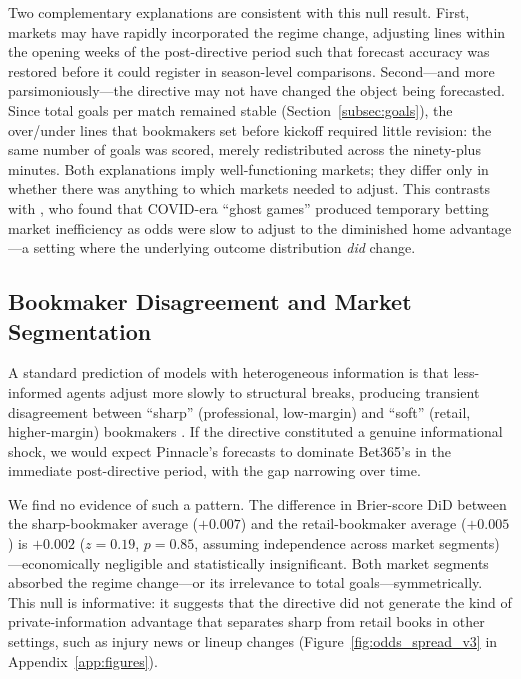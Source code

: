 \documentclass[12pt]{article}
\begin{document}
Two complementary explanations are consistent with this null result.
First, markets may have rapidly incorporated the regime change, adjusting
lines within the opening weeks of the post-directive period such that
forecast accuracy was restored before it could register in
season-level comparisons. Second---and more parsimoniously---the directive
may not have changed the object being forecasted. Since total goals per
match remained stable (Section~\ref{subsec:goals}), the over/under lines that
bookmakers set before kickoff required little revision: the same number of
goals was scored, merely redistributed across the ninety-plus minutes.
Both explanations imply well-functioning markets; they differ only in
whether there was anything to which markets needed to adjust. This contrasts with
\citet{fischer2022home}, who found that COVID-era ``ghost games'' produced
temporary betting market inefficiency as odds were slow to adjust to the
diminished home advantage---a setting where the underlying outcome distribution
\emph{did} change.

\subsection{Bookmaker Disagreement and Market Segmentation}
\label{subsec:disagreement}

A standard prediction of models with heterogeneous information is that
less-informed agents adjust more slowly to structural breaks, producing
transient disagreement between ``sharp'' (professional, low-margin) and
``soft'' (retail, higher-margin) bookmakers \citep{levitt2004gambling}. If the
directive constituted a genuine informational shock, we would expect
Pinnacle's forecasts to dominate Bet365's in the immediate
post-directive period, with the gap narrowing over time.

We find no evidence of such a pattern. The difference in Brier-score DiD
between the sharp-bookmaker average ($+0.007$) and the retail-bookmaker average ($+0.005$) is
$+0.002$ ($z = 0.19$, $p = 0.85$, assuming independence across market segments)---economically negligible and statistically insignificant. Both market
segments absorbed the regime change---or its irrelevance to total
goals---symmetrically. This null is informative: it suggests that the
directive did not generate the kind of private-information advantage that
separates sharp from retail books in other settings, such as injury news
or lineup changes \citep{croxsonreade2014} (Figure~\ref{fig:odds_spread_v3} in Appendix~\ref{app:figures}).
\end{document}
